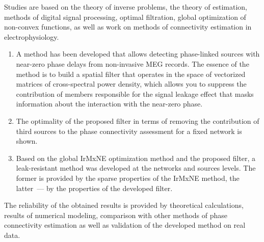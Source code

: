 {\methods}
Studies are based on the theory of inverse problems, the theory of estimation,
methods of digital signal processing, optimal filtration, global optimization
of non-convex functions, as well as work on methods of connectivity estimation
in electrophysiology.

{}
\begin{enumerate}
  \item A method has been developed that allows detecting phase-linked sources with near-zero phase delays from non-invasive MEG records. The essence of the method is to build a spatial filter that operates in the space of vectorized matrices of cross-spectral power density, which allows you to suppress the contribution of members responsible for the signal leakage effect that masks information about the interaction with the near-zero phase.
  \item The optimality of the proposed filter in terms of removing the contribution of third sources to the phase connectivity assessment for a fixed network is shown.
  \item Based on the global IrMxNE optimization method and the proposed filter, a leak-resistant method was developed at the networks and sources levels. The former is provided by the sparse properties of the IrMxNE method, the latter~--- by the properties of the developed filter.
\end{enumerate}

{\reliability} 
The reliability of the obtained results is provided by theoretical
calculations, results of numerical modeling, comparison with other methods of
phase connectivity estimation as well as validation of the developed method on
real data.

{\probation}

